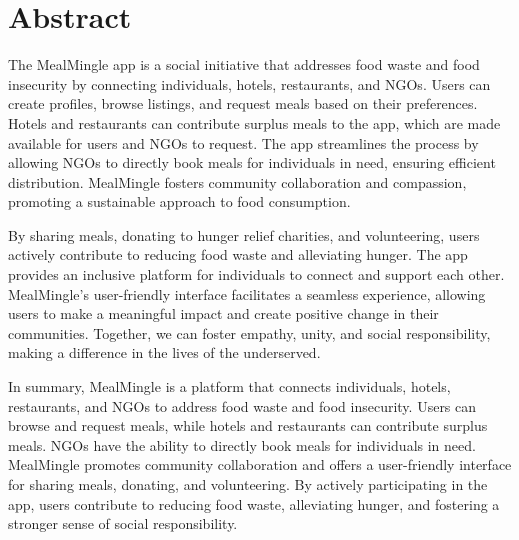 \chapter*{Abstract}%
%
The MealMingle app is a social initiative that addresses food waste and food insecurity by connecting individuals, hotels, restaurants, and NGOs. Users can create profiles, browse listings, and request meals based on their preferences. Hotels and restaurants can contribute surplus meals to the app, which are made available for users and NGOs to request. The app streamlines the process by allowing NGOs to directly book meals for individuals in need, ensuring efficient distribution. MealMingle fosters community collaboration and compassion, promoting a sustainable approach to food consumption.

By sharing meals, donating to hunger relief charities, and volunteering, users actively contribute to reducing food waste and alleviating hunger. The app provides an inclusive platform for individuals to connect and support each other. MealMingle's user-friendly interface facilitates a seamless experience, allowing users to make a meaningful impact and create positive change in their communities. Together, we can foster empathy, unity, and social responsibility, making a difference in the lives of the underserved.

In summary, MealMingle is a platform that connects individuals, hotels, restaurants, and NGOs to address food waste and food insecurity. Users can browse and request meals, while hotels and restaurants can contribute surplus meals. NGOs have the ability to directly book meals for individuals in need. MealMingle promotes community collaboration and offers a user-friendly interface for sharing meals, donating, and volunteering. By actively participating in the app, users contribute to reducing food waste, alleviating hunger, and fostering a stronger sense of social responsibility.
\thispagestyle{plain}

